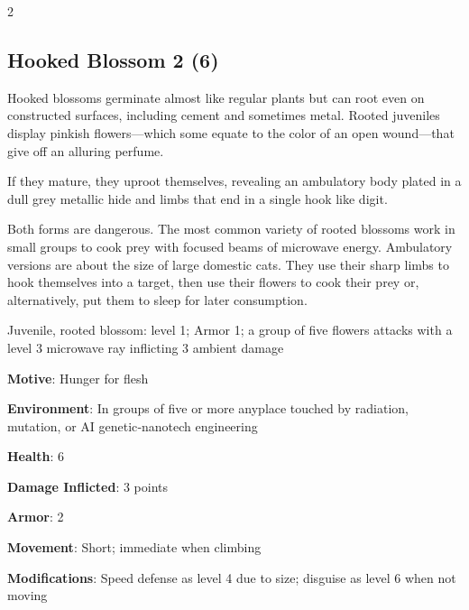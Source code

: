\begin{multicols}{2}

\subsection{Hooked Blossom 2 (6)}

Hooked blossoms germinate almost like regular plants but can root even on constructed surfaces, including cement and sometimes metal. Rooted juveniles display pinkish flowers—which some equate to the color of an open wound—that give off an alluring perfume. 

If they mature, they uproot themselves, revealing an ambulatory body plated in a dull grey metallic hide and limbs that end in a single hook like digit. 

Both forms are dangerous. The most common variety of rooted blossoms work in small groups to cook prey with focused beams of microwave energy. Ambulatory versions are about the size of large domestic cats. They use their sharp limbs to hook themselves into a target, then use their flowers to cook their prey or, alternatively, put them to sleep for later consumption.

Juvenile, rooted blossom: level 1; Armor 1; a group of five flowers attacks with a level 3 microwave ray inflicting 3 ambient damage

\textbf{Motive}: Hunger for flesh

\textbf{Environment}: In groups of five or more anyplace touched by radiation, mutation, or AI genetic‑nanotech engineering

\textbf{Health}: 6

\textbf{Damage Inflicted}: 3 points

\textbf{Armor}: 2

\textbf{Movement}: Short; immediate when climbing

\textbf{Modifications}: Speed defense as level 4 due to size; disguise as level 6 when not moving


\end{multicols}
